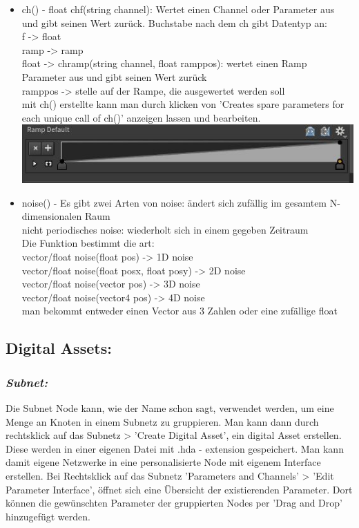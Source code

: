 \documentclass[paper=a4,fontsize=12pt,ngerman]{scrartcl}
\begin{document}
\begin{itemize}
 		\item ch() - float chf(string channel): Wertet einen Channel oder Parameter aus und gibt seinen Wert zurück. Buchstabe nach dem ch gibt Datentyp an:\\ 
 		f -> float\\
 		ramp -> ramp\\
 		float -> chramp(string channel, float ramppos): 
 		wertet einen Ramp Parameter aus und gibt seinen Wert zurück	\\
 		ramppos -> stelle auf der Rampe, die ausgewertet werden soll\\
 		mit ch() erstellte kann man durch klicken von 'Creates spare parameters for each unique call of ch()' anzeigen lassen und bearbeiten. \\
 		\includegraphics*[width=\textwidth]{graphics/attribVOPramp.JPG}\\
 		\item noise() - Es gibt zwei Arten von noise: ändert sich zufällig im gesamtem N-dimensionalen Raum\\
 		nicht periodisches noise: wiederholt sich in einem gegeben Zeitraum\\
 		Die Funktion bestimmt die art:\\
 		vector/float noise(float pos) -> 1D noise\\	
 		vector/float noise(float posx, float posy) -> 2D noise\\
 		vector/float noise(vector pos) -> 3D noise\\
 		vector/float noise(vector4 pos) -> 4D noise\\
 		man bekommt entweder einen Vector aus 3 Zahlen oder eine zufällige float\\
 	\end{itemize}
	
	\subsection*{Digital Assets:}
	\subsubsection*{\textit{Subnet:}}
	Die Subnet Node kann, wie der Name schon sagt, verwendet werden, um eine Menge an Knoten in einem Subnetz zu gruppieren. Man kann dann durch rechtsklick auf das Subnetz > 'Create Digital Asset', ein digital Asset erstellen. Diese werden in einer eigenen Datei mit .hda - extension gespeichert. Man kann damit eigene Netzwerke in eine personalisierte Node mit eigenem Interface erstellen. Bei Rechtsklick auf das Subnetz 'Parameters and Channels' > 'Edit Parameter Interface', öffnet sich eine Übersicht der existierenden Parameter. Dort können die gewünschten Parameter der gruppierten Nodes per 'Drag and Drop' hinzugefügt werden.
\end{document}
